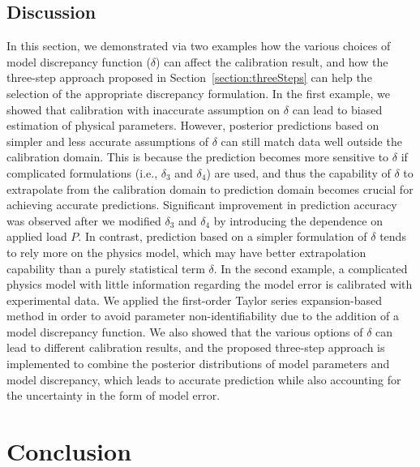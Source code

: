 \documentclass[preprint,review,12pt,3p]{elsarticle}
\begin{document}
\subsection{Discussion}
In this section, we demonstrated via two examples how the various choices of model discrepancy function ($\delta$) can affect the calibration result, and how the three-step approach proposed in Section~\ref{section:threeSteps} can help the selection of the appropriate discrepancy formulation. In the first example, we showed that calibration with inaccurate assumption on $\delta$ can lead to biased estimation of physical parameters. However, posterior predictions based on simpler and less accurate assumptions of $\delta$ can still match data well outside the calibration domain. This is because the prediction becomes more sensitive to $\delta$ if complicated formulations (i.e., $\delta_3$ and $\delta_4$) are used, and thus the capability of $\delta$ to extrapolate from the calibration domain to prediction domain becomes crucial for achieving accurate predictions. Significant improvement in prediction accuracy was observed after we modified $\delta_3$ and $\delta_4$ by introducing the dependence on applied load $P$. In contrast, prediction based on a simpler formulation of $\delta$ tends to rely more on the physics model, which may have better extrapolation capability than a purely statistical term $\delta$. In the second example, a complicated physics model with little information regarding the model error is calibrated with experimental data. We applied the first-order Taylor series expansion-based method in order to avoid parameter non-identifiability due to the addition of a model discrepancy function. We also showed that the various options of $\delta$ can lead to different calibration results, and the proposed three-step approach is implemented to combine the posterior distributions of model parameters and model discrepancy, which leads to accurate prediction while also accounting for the uncertainty in the form of model error.

\section{Conclusion}
\end{document}
